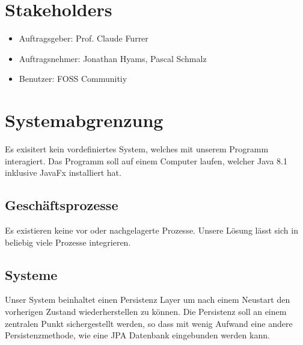 \documentclass[11pt,titelpage]{scrartcl}
\begin{document}
\section{Stakeholders}
\begin{itemize}
\item{Auftragsgeber: Prof. Claude Furrer}
\item{Auftragsnehmer: Jonathan Hyams, Pascal Schmalz}
\item{Benutzer: FOSS Communitiy}
\end{itemize}
\section {Systemabgrenzung}
Es exisitert kein vordefiniertes System, welches mit unserem Programm interagiert.
Das Programm soll auf einem Computer laufen, welcher Java 8.1 inklusive JavaFx installiert hat.

\subsection{Geschäftsprozesse}
Es existieren keine vor\- oder nachgelagerte Prozesse. Unsere Lösung lässt sich in beliebig viele Prozesse integrieren.
\subsection{Systeme}
Unser System beinhaltet einen Persistenz Layer um nach einem Neustart den vorherigen Zustand wiederherstellen zu können.
Die Persistenz soll an einem zentralen Punkt sichergestellt werden, so dass mit wenig Aufwand eine andere
Persistenzmethode, wie eine JPA Datenbank eingebunden werden kann.
\end{document}
